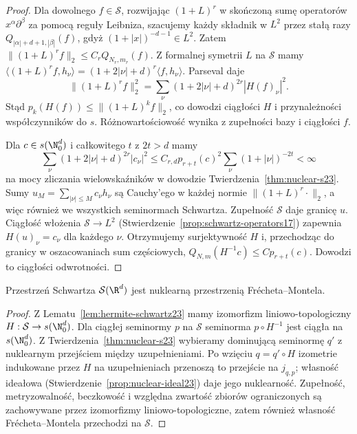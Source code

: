 \begin{proof}
Dla dowolnego $f\in\mathcal S$, rozwijając $(1+L)^r$
w skończoną sumę operatorów $x^\alpha\partial^\beta$
za pomocą reguły Leibniza, szacujemy każdy składnik
w $L^2$ przez stałą razy $Q_{|\alpha|+d+1,|\beta|}(f)$,
gdyż $(1+|x|)^{-d-1}\in L^2$.
Zatem $\|(1+L)^r f\|_2\le C_r Q_{N_r,m_r}(f)$.
Z formalnej symetrii $L$ na $\mathcal S$ mamy
$\langle(1+L)^r f,h_\nu\rangle
=(1+2|\nu|+d)^r\langle f,h_\nu\rangle$.
Parseval daje
\[
 \|(1+L)^r f\|_2^2
 =\sum_\nu(1+2|\nu|+d)^{2r}|H(f)_\nu|^2.
\]
Stąd $p_k(H(f))\le\|(1+L)^k f\|_2$, co dowodzi
ciągłości $H$ i przynależności współczynników do $s$.
Różnowartościowość wynika z zupełności bazy i ciągłości $f$.

Dla $c\in s(\N_0^d)$ i całkowitego $t$ z $2t>d$ mamy
\[
 \sum_\nu(1+2|\nu|+d)^{2r}|c_\nu|^2
 \le C_{r,d}p_{r+t}(c)^2
 \sum_\nu(1+|\nu|)^{-2t}<\infty
\]
na mocy zliczania wielowskaźników w dowodzie
Twierdzenia~\ref{thm:nuclear-s23}.
Sumy $u_M=\sum_{|\nu|\le M}c_\nu h_\nu$ są Cauchy'ego
w każdej normie $\|(1+L)^r\cdot\|_2$, a więc również
we wszystkich seminormach Schwartza. Zupełność
$\mathcal S$ daje granicę $u$. Ciągłość włożenia
$\mathcal S\to L^2$ (Stwierdzenie~\ref{prop:schwartz-operators17})
zapewnia $H(u)_\nu=c_\nu$ dla każdego $\nu$.
Otrzymujemy surjektywność $H$ i, przechodząc do granicy
w oszacowaniach sum częściowych,
$Q_{N,m}(H^{-1}c)\le C p_{r+t}(c)$.
Dowodzi to ciągłości odwrotności.
\end{proof}

\begin{wniosek}
\label{cor:nuclear-schwartz23}
Przestrzeń Schwartza $\mathcal S(\R^d)$ jest nuklearną
przestrzenią Frécheta--Montela.
\end{wniosek}
\begin{proof}
Z Lematu~\ref{lem:hermite-schwartz23} mamy izomorfizm
liniowo-topologiczny $H:\mathcal S\to s(\N_0^d)$.
Dla ciągłej seminormy $p$ na $\mathcal S$ seminorma
$p\circ H^{-1}$ jest ciągła na $s(\N_0^d)$.
Z Twierdzenia~\ref{thm:nuclear-s23} wybieramy dominującą
seminormę $q'$ z nuklearnym przejściem między
uzupełnieniami. Po wzięciu $q=q'\circ H$ izometrie
indukowane przez $H$ na uzupełnieniach przenoszą
to przejście na $j_{q,p}$; własność ideałowa
(Stwierdzenie~\ref{prop:nuclear-ideal23}) daje jego
nuklearność. Zupełność, metryzowalność, beczkowość
i względna zwartość zbiorów ograniczonych są zachowywane
przez izomorfizmy liniowo-topologiczne, zatem również
własność Frécheta--Montela przechodzi na $\mathcal S$.
\end{proof}

